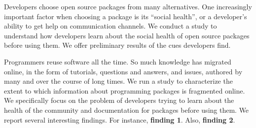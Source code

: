 Developers choose open source packages from many alternatives.
One increasingly important factor when choosing a package is its ``social health'', or a developer's ability to get help on communication channels.
We conduct a study to understand how developers learn about the social health of open source packages before using them.
We offer preliminary results of the cues developers find.

Programmers reuse software all the time.
So much knowledge has migrated online, in the form of tutorials, questions and answers, and issues, authored by many and over the course of long times.
We run a study to characterize the extent to which information about programming packages is fragmented online.
We specifically focus on the problem of developers trying to learn about the health of the community and documentation for packages before using them.
We report several interesting findings.
For instance, \textbf{finding 1}.
Also, \textbf{finding 2}.
\fi
